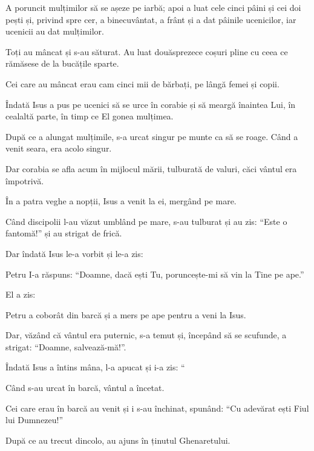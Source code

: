 {A poruncit mulțimilor să se așeze pe iarbă; apoi a luat cele cinci pâini și cei doi pești și, privind spre cer, a binecuvântat, a frânt și a dat pâinile ucenicilor, iar ucenicii au dat mulțimilor.

Toți au mâncat și s-au săturat. Au luat douăsprezece coșuri pline cu ceea ce rămăsese de la bucățile sparte.

Cei care au mâncat erau cam cinci mii de bărbați, pe lângă femei și copii.


\par }{\PP {}Îndată Isus a pus pe ucenici să se urce în corabie și să meargă înaintea Lui, în cealaltă parte, în timp ce El gonea mulțimea.

După ce a alungat mulțimile, s-a urcat singur pe munte ca să se roage. Când a venit seara, era acolo singur.

Dar corabia se afla acum în mijlocul mării, tulburată de valuri, căci vântul era împotrivă.

În a patra veghe a nopții, Isus a venit la ei, mergând pe mare.

Când discipolii l-au văzut umblând pe mare, s-au tulburat și au zis: “Este o fantomă!” și au strigat de frică.

Dar îndată Isus le-a vorbit și le-a zis:
{}


\par }{\PP {}Petru I-a răspuns: “Doamne, dacă ești Tu, poruncește-mi să vin la Tine pe ape.”


\par }{\PP {}El a zis:
{}

\par }{\PP Petru a coborât din barcă și a mers pe ape pentru a veni la Isus.

Dar, văzând că vântul era puternic, s-a temut și, începând să se scufunde, a strigat: “Doamne, salvează-mă!”.


\par }{\PP {}Îndată Isus a întins mâna, l-a apucat și i-a zis: “{}

Când s-au urcat în barcă, vântul a încetat.

Cei care erau în barcă au venit și i s-au închinat, spunând: “Cu adevărat ești Fiul lui Dumnezeu!”


\par }{\PP {}După ce au trecut dincolo, au ajuns în ținutul Ghenaretului.

}

